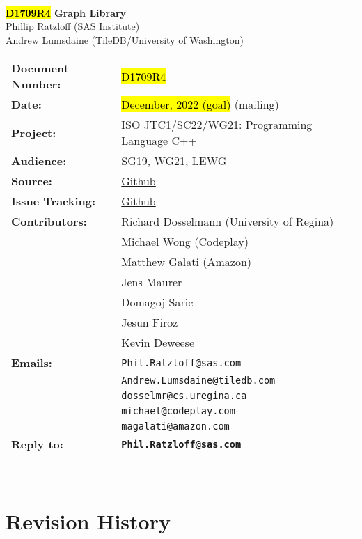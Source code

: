 \documentclass[10pt,onecolumn]{article}
\begin{document}
\begin{titlepage}
~
\vfill
\begin{center}
\LARGE
\textbf{\hl{D1709R4} Graph Library}\\
\vspace{12pt}
\normalsize
	Phillip Ratzloff (SAS Institute)\\
	Andrew Lumsdaine (TileDB/University of Washington)\\
\end{center}
\vspace{32pt}
\begin{tabular}{ll}
\textbf{Document Number:} & \hl{D1709R4} \\
\textbf{Date:} & \hl{December, 2022 (goal)} (mailing)\\ 
\textbf{Project:} & ISO JTC1/SC22/WG21: Programming Language C++\\
\textbf{Audience:} & SG19, WG21, LEWG\\
\textbf{Source:} & \href{https://github.com/stdgraph/graph-v2}{Github} \\
\textbf{Issue Tracking:} & \href{https://github.com/stdgraph/graph-v2/issues}{Github} \\
\textbf{Contributors:}
	&Richard Dosselmann (University of Regina)\\
	&Michael Wong (Codeplay)\\
	&Matthew Galati (Amazon)\\	
	&Jens Maurer\\
	&Domagoj Saric\\
	&Jesun Firoz\\
	&Kevin Deweese\\
\textbf{Emails:}
	&\texttt{Phil.Ratzloff@sas.com}\\
	&\texttt{Andrew.Lumsdaine@tiledb.com}\\
	&\texttt{dosselmr@cs.uregina.ca}\\
	&\texttt{michael@codeplay.com}\\
	&\texttt{magalati@amazon.com}\\
\textbf{Reply to:}
	&\texttt{\textbf{Phil.Ratzloff@sas.com}}\\
\end{tabular}
\vfill
~
\end{titlepage}

\tableofcontents

\clearpage

\section*{Revision History}
\end{document}
